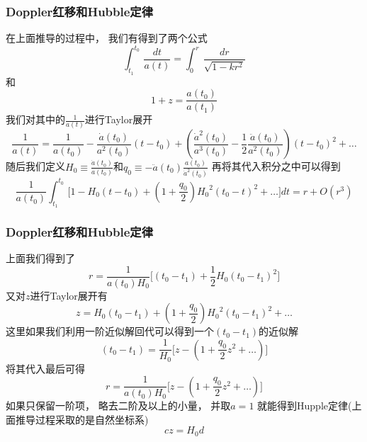 \documentclass[8pt]{beamer}
\begin{document}
        \begin{frame}[fragile]
            \frametitle{Doppler红移和Hubble定律}
                \qquad
                在上面推导的过程中，
                我们有得到了两个公式
                $$\int_{t_1}^{t_0}\,\frac{dt}{a(t)}=\int_{0}^{r}\,\frac{dr}{\sqrt{1-kr^2}}$$
                和$$1+z=\frac{a(t_0)}{a(t_1)}$$
                我们对其中的$\frac{1}{a(t)}$进行Taylor展开
                $$\frac{1}{a(t)}=\frac{1}{a(t_0)}-\frac{\dot{a}(t_0)}{a^2(t_0)}(t-t_0)+(\frac{\dot{a}^2(t_0)}{a^3(t_0)}-\frac{1}{2}\frac{\ddot{a}(t_0)}{a^2(t_0)})(t-t_0)^2+\ldots $$
                随后我们定义$H_0\equiv\frac{\dot{a}(t_0)}{a(t_0)}$和$q_0\equiv-\ddot{a}(t_0)\frac{a(t_0)}{\dot{a}^2(t_0)}$
                再将其代入积分之中可以得到
                $$\frac{1}{a(t_0)}\int_{t_1}^{t_0}\,\bigg[1-H_0(t-t_0)+(1+\frac{q_0}{2}){H_0}^2(t_0-t)^2+\ldots\bigg]dt=r+O(r^3)$$
                

        \end{frame}
        \begin{frame}[fragile]
            \frametitle{Doppler红移和Hubble定律}
                \qquad
                上面我们得到了
                $$r=\frac{1}{a(t_0)H_0}\bigg[(t_0-t_1)+\frac{1}{2}H_0(t_0-t_1)^2\bigg]$$
                又对$z$进行Taylor展开有
                $$z=H_0(t_0-t_1)+(1+\frac{q_0}{2}){H_0}^2(t_0-t_1)^2+\ldots$$
                这里如果我们利用一阶近似解回代可以得到一个$(t_0-t_1)$的近似解
                $$(t_0-t_1)=\frac{1}{H_0}\bigg[z-(1+\frac{q_0}{2}z^2+\ldots)\bigg]$$
                将其代入最后可得
                $$r=\frac{1}{a(t_0)H_0}\bigg[z-(1+\frac{q_0}{2}z^2+\ldots)\bigg]$$
                如果只保留一阶项，
                略去二阶及以上的小量，
                并取$a=1$
                就能得到Hupple定律(上面推导过程采取的是自然坐标系)
                $$cz=H_0d$$

        \end{frame}
\end{document}
